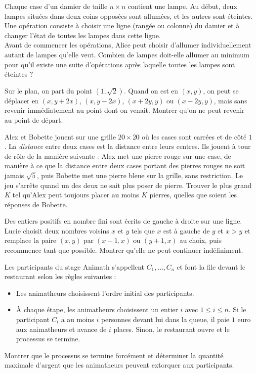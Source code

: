 \begin{exo}
Chaque case d'un damier de taille $n \times  n$ contient une lampe. Au début, deux lampes situées dans deux coins opposées sont allumées, et les autres sont éteintes. Une opération consiste à choisir une ligne (rangée ou colonne) du damier et à changer l'état de toutes les lampes dans cette ligne. \\
Avant de commencer les opérations, Alice peut choisir d'allumer individuellement autant de lampes qu'elle veut. Combien de lampes doit-elle allumer au minimum pour qu'il existe une suite d'opérations après laquelle toutes les lampes sont éteintes ?
\end{exo}


\begin{exo}
Sur le plan, on part du point $(1,\sqrt2)$. Quand on est en $(x,y)$, on peut se déplacer en $(x,y+2x)$, $(x,y-2x)$, $(x+2y,y)$ ou $(x-2y,y)$, mais sans revenir immédiatement au point dont on venait. Montrer qu'on ne peut revenir au point de départ.
\end{exo}


\begin{exo}
Alex et Bobette jouent sur une grille $20 \times 20$ où les cases sont carrées et de côté $1$. La \emph{distance} entre deux cases est la distance entre leurs centres. Ils jouent à tour de rôle de la manière suivante : Alex met une pierre rouge sur une case, de manière à ce que la distance entre deux cases portant des pierres rouges ne soit jamais $\sqrt5$, puis Bobette met une pierre bleue sur la grille, sans restriction. Le jeu s'arrête quand un des deux ne sait plus poser de pierre. Trouver le plus grand $K$ tel qu'Alex peut toujours placer au moins $K$ pierres, quelles que soient les réponses de Bobette.
\end{exo}


\begin{exo}
Des entiers positifs en nombre fini sont écrits de gauche à droite sur une ligne. Lucie choisit deux nombres voisins $x$ et $y$ tels que $x$ est à gauche de $y$ et $x>y$ et remplace la paire $(x,y)$ par $(x-1,x)$ ou $(y+1,x)$ au choix, puis recommence tant que possible. Montrer qu'elle ne peut continuer indéfiniment.
\end{exo}


\begin{exo}
Les participants du stage Animath s'appellent $C_1,\dots,C_n$ et font la file devant le restaurant selon les règles suivantes :
\begin{itemize}
\item Les animatheurs choisissent l'ordre initial des participants.
\item À chaque étape, les animatheurs choisissent un entier $i$ avec $1\le i\le n$. Si le participant $C_i$ a au moins $i$ personnes devant lui dans la queue, il paie $1$ euro aux animatheurs et avance de $i$ places. Sinon, le restaurant ouvre et le processus se termine.
\end{itemize}
Montrer que le processus se termine forcément et déterminer la quantité maximale d'argent que les animatheurs peuvent extorquer aux participants.
\end{exo}


